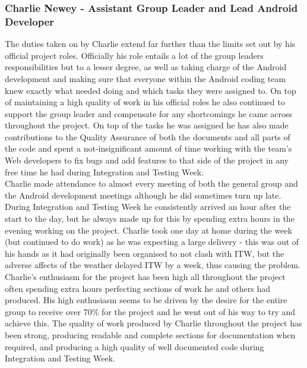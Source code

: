 \documentclass{article}
\begin{document}
		\subsubsection{Charlie Newey - Assistant Group Leader and Lead Android Developer}
		The duties taken on by Charlie extend far further than the limits set out by his official project roles. Officially his role entails a lot of the group leaders responsibilities but to a lesser degree, as well as taking charge of the Android development and making sure that everyone within the Android coding team knew exactly what needed doing and which tasks they were assigned to. On top of maintaining a high quality of work in his official roles he also continued to support the group leader and compensate for any shortcomings he came across throughout the project. On top of the tasks he was assigned he has also made contributions to the Quality Assurance of both the documents and all parts of the code and spent a not-insignificant amount of time working with the team's Web developers to fix bugs and add features to that side of the project in any free time he had during Integration and Testing Week. \\
		
		Charlie made attendance to almost every meeting of both the general group and the Android development meetings although he did sometimes turn up late. During Integration and Testing Week he consistently arrived an hour after the start to the day, but he always made up for this by spending extra hours in the evening working on the project. Charlie took one day at home during the week (but continued to do work) as he was expecting a large delivery - this was out of his hands as it had originally been organised to not clash with ITW, but the adverse affects of the weather delayed ITW by a week, thus causing the problem. \\
		
		Charlie's enthusiasm for the project has been high all throughout the project often spending extra hours perfecting sections of work he and others had produced. His high enthusiasm seems to be driven by the desire for the entire group to receive over 70\% for the project and he went out of his way to try and achieve this. The quality of work produced by Charlie throughout the project has been strong, producing readable and complete sections for documentation when required, and producing a high quality of well documented code during Integration and Testing Week. \\
		
\end{document}
